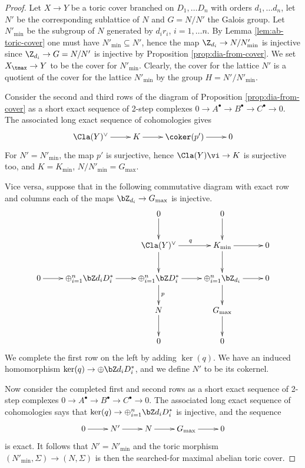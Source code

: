 \documentclass[10pt]{amsart}
\numberwithin{equation}{section}
\begin{document}
\begin{proof}
 Let $X\to Y$ be a toric cover branched on $D_1,\dots D_n$ with orders $d_1,\dots d_n$, let  $N'$ be the corresponding  sublattice of $N$ and $G=N/N'$ the Galois group. 
  Let $N'_{\min}$ be the subgroup of $N$ generated by $d_ir_i$, $i=1,\dots n$. By Lemma \ref{lem:ab-toric-cover} 
  one must have $N'_{\min} \subseteq N'$, hence the map $\Z_{d_i}\to N/N'_{\min}$ is injective since $\Z_{d_i}\to G=N/N'$ is injective by Proposition \ref{prop:dia-from-cover}.  We set $X_{\tmax}\to Y$ to be the cover for
  $N'_{\min}$. Clearly, the cover for the
  lattice $N'$ is a quotient of the cover for the lattice $N'_{\min}$
  by the group $H=N'/N'_{\min}$.

  Consider the second and third rows of the diagram of Proposition \ref{prop:dia-from-cover} as a short exact sequence of
  2-step complexes $0\to A^{\bullet} \to B^{\bullet} \to C^{\bullet}
  \to 0$. The associated long exact sequence of cohomologies gives
  \begin{displaymath}
    \xymatrix{
      \Cla(Y)^{\vee} \ar[r]
      &K \ar[r]
      &\coker(p') \ar[r]
      &0
      }      
  \end{displaymath}
For  $N'=N'_{\min}$, the map $p'$ is surjective, hence  $\Cla(Y)\vi\to K$ is surjective too, and  $K=K_{\min}$, $N/N'_{\min}=G_{\max}$. 

Vice versa, 
 suppose that in the following commutative diagram
  with exact row and columns  each of the maps $\bZ_{d_i}\to
  G_{\max}$ is injective. 
  \begin{displaymath}
    \xymatrix{
      &&0 \ar[d]
      &0 \ar[d] \\
      &&\Cla(Y)^{\vee}\ar[r]^q\ar[d]
      &K_{\min}\ar[d]\ar[r]
      &0 \\
      0 \ar[r] 
      &\oplus_{i=1}^n \bZ d_i D_i^* \ar[r]
      &\oplus_{i=1}^n \bZ D_i^* \ar[r]\ar^p[d]
      &\oplus_{i=1}^n \bZ_{d_i}  \ar[r]\ar[d]
      &0 \\
      &
      &N \ar[d]
      &G_{\max} \ar[d]
      & \\
      &&0
      &0 
      }
  \end{displaymath}
   We complete the first  row on the left by adding $\ker(q)$. We have
  an induced homomorphism $\ker(q) \to \oplus\bZ d_iD_i^*$, and we 
  define $N'$ to be its cokernel. 

  Now consider the  completed first and  second rows as a short
  exact sequence of 2-step complexes $0\to A^{\bullet} \to B^{\bullet}
  \to C^{\bullet} \to 0$. The associated long exact sequence of
  cohomologies says that $\ker(q) \to \oplus_{i=1}^n\bZ d_iD_i^*$ is
  injective, and the sequence
  \begin{displaymath}
    \xymatrix{
      0 \ar[r]
      &N' \ar[r]
      &N \ar[r]
      &G_{\max} \ar[r]
      &0 
    }
  \end{displaymath}
  is exact. It follows that $N'=N'_{\min}$  and the toric morphism 
  $(N'_{\min},\Sigma)\to (N,\Sigma)$  is then the searched-for
  maximal abelian toric cover.
\end{proof}
\end{document}

